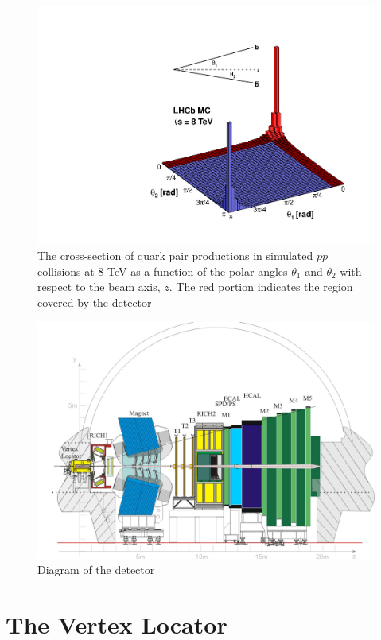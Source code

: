 \begin{figure}
\centering
\includegraphics[width=0.5\linewidth]{figures/detector/08_rad_acc_scheme_right.pdf}
\caption{The cross-section of \bquark\bquarkbar quark pair productions in simulated $pp$ collisions at 8 TeV as a function of the polar angles $\theta_1$ and $\theta_2$ with respect to the beam axis, $z$. The red portion indicates the region covered by the \lhcb detector}
\label{bbar}
\end{figure}

\begin{figure}
\includegraphics[width=\linewidth]{figures/detector/lhcb.pdf}
\caption{Diagram of the \lhcb detector}
\label{lhcbdetector}
\end{figure}

\section{The Vertex Locator}
\label{sec:detector:velo}

